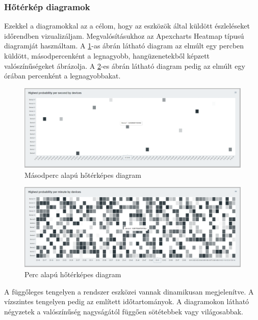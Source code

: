 \subsubsection{Hőtérkép diagramok}
Ezekkel a diagramokkal az a célom, hogy az eszközök által küldött észleléseket időrendben vizualizáljam.
Megvalósításukhoz az Apexcharts Heatmap típusú diagramját használtam.
A \ref{fig:dashboard-heatmap-second}-as ábrán látható diagram az elmúlt egy percben küldött, másodpercenként a legnagyobb, hangüzenetekből képzett valószínűségeket ábrázolja.
A \ref{fig:dashboard-heatmap-minute}-es ábrán látható diagram pedig az elmúlt egy órában percenként a legnagyobbakat.
\begin{figure}[!ht]
    \centering
    \includegraphics[width=150mm, keepaspectratio]{figures/second-heatmap.png}
    \caption{Másodperc alapú hőtérképes diagram}
    \label{fig:dashboard-heatmap-second}
\end{figure}
\begin{figure}[!ht]
    \centering
    \includegraphics[width=150mm, keepaspectratio]{figures/minute-heatmap.png}
    \caption{Perc alapú hőtérképes diagram}
    \label{fig:dashboard-heatmap-minute}
\end{figure}

A függőleges tengelyen a rendszer eszközei vannak dinamikusan megjelenítve.
A vízszintes tengelyen pedig az említett időtartományok.
A diagramokon látható négyzetek a valószínűség nagyságától függően sötétebbek vagy világosabbak.
\newpage
